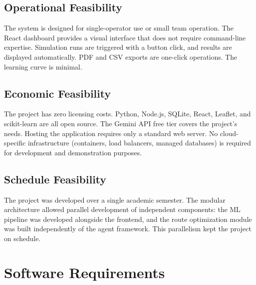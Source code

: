 \subsection{Operational Feasibility}

The system is designed for single-operator use or small team operation. The React dashboard provides a visual interface that does not require command-line expertise. Simulation runs are triggered with a button click, and results are displayed automatically. PDF and CSV exports are one-click operations. The learning curve is minimal.

\subsection{Economic Feasibility}

The project has zero licensing costs. Python, Node.js, SQLite, React, Leaflet, and scikit-learn are all open source. The Gemini API free tier covers the project's needs. Hosting the application requires only a standard web server. No cloud-specific infrastructure (containers, load balancers, managed databases) is required for development and demonstration purposes.

\subsection{Schedule Feasibility}

The project was developed over a single academic semester. The modular architecture allowed parallel development of independent components: the ML pipeline was developed alongside the frontend, and the route optimization module was built independently of the agent framework. This parallelism kept the project on schedule.

\section{Software Requirements}
\label{sec:software_requirements}

